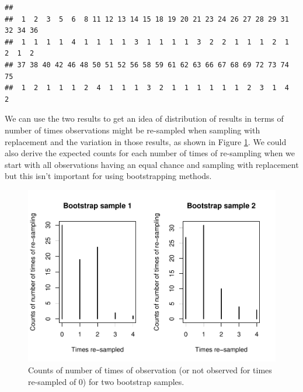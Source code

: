 \documentclass[]{book}
\newenvironment{Shaded}{\begin{snugshade}}{\end{snugshade}}
\newcommand{\KeywordTok}[1]{\textcolor[rgb]{0.13,0.29,0.53}{\textbf{{#1}}}}
\newcommand{\StringTok}[1]{\textcolor[rgb]{0.31,0.60,0.02}{{#1}}}
\newcommand{\NormalTok}[1]{{#1}}
\begin{document}
\begin{Shaded}
\end{Shaded}

\begin{verbatim}
## 
##  1  2  3  5  6  8 11 12 13 14 15 18 19 20 21 23 24 26 27 28 29 31 32 34 36 
##  1  1  1  1  4  1  1  1  1  3  1  1  1  1  3  2  2  1  1  1  2  1  2  1  2 
## 37 38 40 42 46 48 50 51 52 56 58 59 61 62 63 66 67 68 69 72 73 74 75 
##  1  2  1  1  1  2  4  1  1  1  3  2  1  1  1  1  1  1  2  3  1  4  2
\end{verbatim}

We can use the two results to get an idea of distribution of results in
terms of number of times observations might be re-sampled when sampling
with replacement and the variation in those results, as shown in Figure
\ref{fig:Figure2-17}. We could also derive the expected counts for each
number of times of re-sampling when we start with all observations
having an equal chance and sampling with replacement but this isn't
important for using bootstrapping methods.




\begin{figure}[htbp]
\centering
\includegraphics{GreenwoodBanner_files/figure-latex/Figure2-17-1.pdf}
\caption{\label{fig:Figure2-17}Counts of number of times of observation (or not observed
for times re-sampled of 0) for two bootstrap samples.}
\end{figure}
\end{document}
